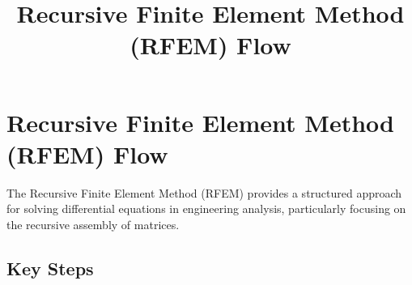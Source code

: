 \documentclass{article}
\title{Recursive Finite Element Method (RFEM) Flow}
\author{}
\date{}
\begin{document}
\maketitle

\section*{Recursive Finite Element Method (RFEM) Flow}

The Recursive Finite Element Method (RFEM) provides a structured approach for solving differential equations in engineering analysis, particularly focusing on the recursive assembly of matrices.

\subsection*{Key Steps}
\end{document}
